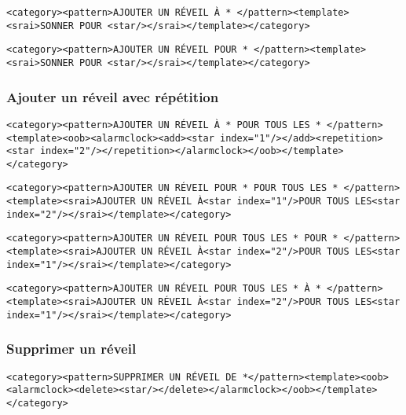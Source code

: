 \begin{lstlisting}[frame=none,aboveskip=0.5em]
<category><pattern>AJOUTER UN RÉVEIL À * </pattern><template><srai>SONNER POUR <star/></srai></template></category>
\end{lstlisting}

\begin{lstlisting}[frame=none,aboveskip=0.5em]
<category><pattern>AJOUTER UN RÉVEIL POUR * </pattern><template><srai>SONNER POUR <star/></srai></template></category>
\end{lstlisting}

\subsubsection{Ajouter un réveil avec répétition}
\begin{lstlisting}[frame=none,aboveskip=0.5em]
<category><pattern>AJOUTER UN RÉVEIL À * POUR TOUS LES * </pattern><template><oob><alarmclock><add><star index="1"/></add><repetition><star index="2"/></repetition></alarmclock></oob></template></category>
\end{lstlisting}

\begin{lstlisting}[frame=none,aboveskip=0.5em]
<category><pattern>AJOUTER UN RÉVEIL POUR * POUR TOUS LES * </pattern><template><srai>AJOUTER UN RÉVEIL À<star index="1"/>POUR TOUS LES<star index="2"/></srai></template></category>
\end{lstlisting}

\begin{lstlisting}[frame=none,aboveskip=0.5em]
<category><pattern>AJOUTER UN RÉVEIL POUR TOUS LES * POUR * </pattern><template><srai>AJOUTER UN RÉVEIL À<star index="2"/>POUR TOUS LES<star index="1"/></srai></template></category>
\end{lstlisting}

\begin{lstlisting}[frame=none,aboveskip=0.5em]
<category><pattern>AJOUTER UN RÉVEIL POUR TOUS LES * À * </pattern><template><srai>AJOUTER UN RÉVEIL À<star index="2"/>POUR TOUS LES<star index="1"/></srai></template></category>
\end{lstlisting}

\subsubsection{Supprimer un réveil}
\begin{lstlisting}[frame=none,aboveskip=0.5em]
<category><pattern>SUPPRIMER UN RÉVEIL DE *</pattern><template><oob>
<alarmclock><delete><star/></delete></alarmclock></oob></template></category>
\end{lstlisting}

